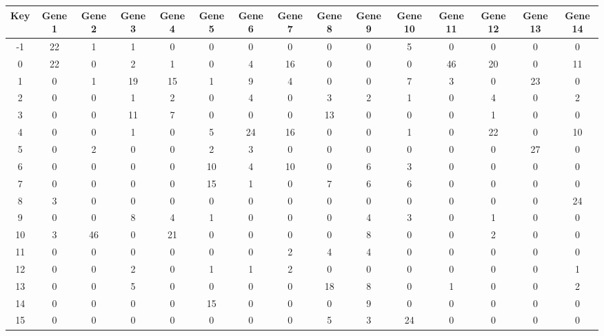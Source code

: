\begin{tabular}{|c|c|c|c|c|c|c|c|c|c|c|c|c|c|c|}
\hline
Key & Gene 1 & Gene 2 & Gene 3 & Gene 4 & Gene 5 & Gene 6 & Gene 7 & Gene 8 & Gene 9 & Gene 10 & Gene 11 & Gene 12 & Gene 13 & Gene 14 \\
\hline
-1 & 22 & 1 & 1 & 0 & 0 & 0 & 0 & 0 & 0 & 5 & 0 & 0 & 0 & 0 \\
0 & 22 & 0 & 2 & 1 & 0 & 4 & 16 & 0 & 0 & 0 & 46 & 20 & 0 & 11 \\
1 & 0 & 1 & 19 & 15 & 1 & 9 & 4 & 0 & 0 & 7 & 3 & 0 & 23 & 0 \\
2 & 0 & 0 & 1 & 2 & 0 & 4 & 0 & 3 & 2 & 1 & 0 & 4 & 0 & 2 \\
3 & 0 & 0 & 11 & 7 & 0 & 0 & 0 & 13 & 0 & 0 & 0 & 1 & 0 & 0 \\
4 & 0 & 0 & 1 & 0 & 5 & 24 & 16 & 0 & 0 & 1 & 0 & 22 & 0 & 10 \\
5 & 0 & 2 & 0 & 0 & 2 & 3 & 0 & 0 & 0 & 0 & 0 & 0 & 27 & 0 \\
6 & 0 & 0 & 0 & 0 & 10 & 4 & 10 & 0 & 6 & 3 & 0 & 0 & 0 & 0 \\
7 & 0 & 0 & 0 & 0 & 15 & 1 & 0 & 7 & 6 & 6 & 0 & 0 & 0 & 0 \\
8 & 3 & 0 & 0 & 0 & 0 & 0 & 0 & 0 & 0 & 0 & 0 & 0 & 0 & 24 \\
9 & 0 & 0 & 8 & 4 & 1 & 0 & 0 & 0 & 4 & 3 & 0 & 1 & 0 & 0 \\
10 & 3 & 46 & 0 & 21 & 0 & 0 & 0 & 0 & 8 & 0 & 0 & 2 & 0 & 0 \\
11 & 0 & 0 & 0 & 0 & 0 & 0 & 2 & 4 & 4 & 0 & 0 & 0 & 0 & 0 \\
12 & 0 & 0 & 2 & 0 & 1 & 1 & 2 & 0 & 0 & 0 & 0 & 0 & 0 & 1 \\
13 & 0 & 0 & 5 & 0 & 0 & 0 & 0 & 18 & 8 & 0 & 1 & 0 & 0 & 2 \\
14 & 0 & 0 & 0 & 0 & 15 & 0 & 0 & 0 & 9 & 0 & 0 & 0 & 0 & 0 \\
15 & 0 & 0 & 0 & 0 & 0 & 0 & 0 & 5 & 3 & 24 & 0 & 0 & 0 & 0 \\
\hline
\end{tabular}